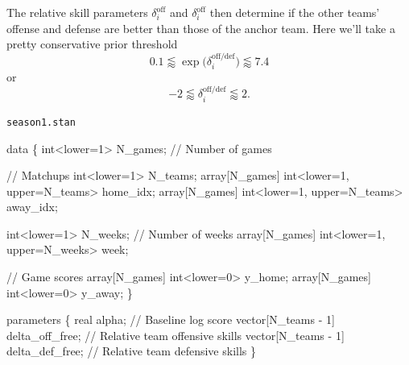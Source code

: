 \documentclass[
  letterpaper,
  DIV=11,
  numbers=noendperiod]{scrartcl}
\newenvironment{Shaded}{\begin{snugshade}}{\end{snugshade}}
\newcommand{\CommentTok}[1]{\textcolor[rgb]{0.37,0.37,0.37}{#1}}
\newcommand{\DataTypeTok}[1]{\textcolor[rgb]{0.68,0.00,0.00}{#1}}
\newcommand{\DecValTok}[1]{\textcolor[rgb]{0.68,0.00,0.00}{#1}}
\newcommand{\KeywordTok}[1]{\textcolor[rgb]{0.00,0.23,0.31}{#1}}
\newcommand{\NormalTok}[1]{\textcolor[rgb]{0.00,0.23,0.31}{#1}}
\begin{document}
The relative skill parameters \(\delta_{i}^{\mathrm{off}}\) and
\(\delta_{i}^{\mathrm{off}}\) then determine if the other teams' offense
and defense are better than those of the anchor team. Here we'll take a
pretty conservative prior threshold \[
0.1
\lessapprox
\exp \big( \delta_{i}^{\mathrm{off/def}} \big)
\lessapprox
7.4
\] or \[
-2 \lessapprox \delta_{i}^{\mathrm{off/def}} \lessapprox 2.
\]

\begin{codelisting}

\caption{\texttt{season1.stan}}

\begin{Shaded}
\begin{Highlighting}[]
\KeywordTok{data}\NormalTok{ \{}
  \DataTypeTok{int}\NormalTok{\textless{}}\KeywordTok{lower}\NormalTok{=}\DecValTok{1}\NormalTok{\textgreater{} N\_games; }\CommentTok{// Number of games}

  \CommentTok{// Matchups}
  \DataTypeTok{int}\NormalTok{\textless{}}\KeywordTok{lower}\NormalTok{=}\DecValTok{1}\NormalTok{\textgreater{} N\_teams;}
  \DataTypeTok{array}\NormalTok{[N\_games] }\DataTypeTok{int}\NormalTok{\textless{}}\KeywordTok{lower}\NormalTok{=}\DecValTok{1}\NormalTok{, }\KeywordTok{upper}\NormalTok{=N\_teams\textgreater{} home\_idx;}
  \DataTypeTok{array}\NormalTok{[N\_games] }\DataTypeTok{int}\NormalTok{\textless{}}\KeywordTok{lower}\NormalTok{=}\DecValTok{1}\NormalTok{, }\KeywordTok{upper}\NormalTok{=N\_teams\textgreater{} away\_idx;}

  \DataTypeTok{int}\NormalTok{\textless{}}\KeywordTok{lower}\NormalTok{=}\DecValTok{1}\NormalTok{\textgreater{} N\_weeks; }\CommentTok{// Number of weeks}
  \DataTypeTok{array}\NormalTok{[N\_games] }\DataTypeTok{int}\NormalTok{\textless{}}\KeywordTok{lower}\NormalTok{=}\DecValTok{1}\NormalTok{, }\KeywordTok{upper}\NormalTok{=N\_weeks\textgreater{} week;}

  \CommentTok{// Game scores}
  \DataTypeTok{array}\NormalTok{[N\_games] }\DataTypeTok{int}\NormalTok{\textless{}}\KeywordTok{lower}\NormalTok{=}\DecValTok{0}\NormalTok{\textgreater{} y\_home;}
  \DataTypeTok{array}\NormalTok{[N\_games] }\DataTypeTok{int}\NormalTok{\textless{}}\KeywordTok{lower}\NormalTok{=}\DecValTok{0}\NormalTok{\textgreater{} y\_away;}
\NormalTok{\}}

\KeywordTok{parameters}\NormalTok{ \{}
  \DataTypeTok{real}\NormalTok{ alpha;                         }\CommentTok{// Baseline log score}
  \DataTypeTok{vector}\NormalTok{[N\_teams {-} }\DecValTok{1}\NormalTok{] delta\_off\_free; }\CommentTok{// Relative team offensive skills}
  \DataTypeTok{vector}\NormalTok{[N\_teams {-} }\DecValTok{1}\NormalTok{] delta\_def\_free; }\CommentTok{// Relative team defensive skills}
\NormalTok{\}}


\end{Highlighting}
\end{Shaded}
\end{codelisting}
\end{document}
